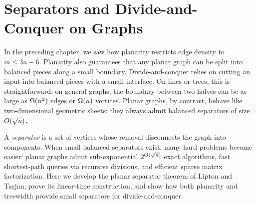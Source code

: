 \chapter{Separators and Divide-and-Conquer on Graphs}

In the preceding chapter, we saw how planarity restricts edge density to $m\le 3n-6$.
Planarity also guarantees that
any planar graph can be split into balanced pieces along a small boundary. Divide-and-conquer
relies on cutting an input into balanced pieces with a small interface. On lines or trees,
this is straightforward; on general graphs, the boundary between two halves can be as large as
$\Omega(n^2)$ edges or $\Omega(n)$ vertices. Planar graphs, by contrast, behave like two-dimensional
geometric sheets: they always admit balanced separators of size $O(\sqrt{n})$.

A \emph{separator} is a set of vertices whose removal disconnects the graph into components.
When small balanced separators exist, many hard problems become easier: planar graphs admit
sub-exponential $2^{O(\sqrt{n})}$ exact algorithms, fast shortest-path queries via
recursive divisions, and efficient sparse matrix factorization. Here we develop the planar
separator theorem of Lipton and Tarjan, prove its linear-time construction, and show how
both planarity and treewidth provide small separators for divide-and-conquer.


